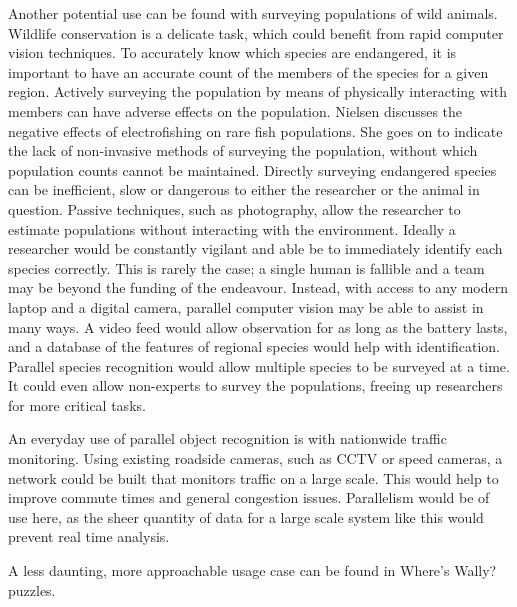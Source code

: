 \documentclass[../main.tex]{subfiles}
\begin{document}
    Another potential use can be found with surveying populations of wild animals.
    Wildlife conservation is a delicate task, which could benefit from rapid computer vision techniques.
    To accurately know which species are endangered, it is important to have an accurate count of the members of the species for a given region.
    Actively surveying the population by means of physically interacting with members can have adverse effects on the population.
    Nielsen \cite{electrofishing} discusses the negative effects of electrofishing on rare fish populations.
    She goes on to indicate the lack of non-invasive methods of surveying the population, without which population counts cannot be maintained.
    Directly surveying endangered species can be inefficient, slow or dangerous to either the researcher or the animal in question.
    Passive techniques, such as photography, allow the researcher to estimate populations without interacting with the environment.
    Ideally a researcher would be constantly vigilant and able be to immediately identify each species correctly.
    This is rarely the case; a single human is fallible and a team may be beyond the funding of the endeavour.
    Instead, with access to any modern laptop and a digital camera, parallel computer vision may be able to assist in many ways.
    A video feed would allow observation for as long as the battery lasts, and a database of the features of regional species would help with identification.
    Parallel species recognition would allow multiple species to be surveyed at a time.
    It could even allow non-experts to survey the populations, freeing up researchers for more critical tasks.
      
    An everyday use of parallel object recognition is with nationwide traffic monitoring.
    Using existing roadside cameras, such as CCTV or speed cameras, a network could be built that monitors traffic on a large scale.
    This would help to improve commute times and general congestion issues.
    Parallelism would be of use here, as the sheer quantity of data for a large scale system like this would prevent real time analysis.

    A less daunting, more approachable usage case can be found in Where's Wally? puzzles.
\end{document}
